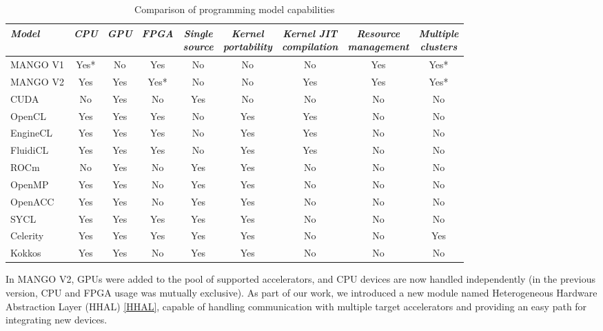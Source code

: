 \begin{table}[ht]
    \centering
    \begin{tabular}{l|c|c|c|c|c|c|c|c}
    \textit{Model} & \textit{CPU} & \textit{GPU} & \textit{FPGA} & \makecell{\textit{Single} \\ \textit{source}} & \makecell{\textit{Kernel} \\ \textit{portability}} & \makecell{\textit{Kernel JIT} \\ \textit{compilation}} & \makecell{\textit{Resource} \\ \textit{management}} & \makecell{\textit{Multiple} \\ \textit{clusters}} \\ \hline
    MANGO V1 & Yes* & No & Yes & No & No & No & Yes & Yes* \\
    MANGO V2 & Yes & Yes & Yes* & No & No & Yes & Yes & Yes* \\
    CUDA & No & Yes & No & Yes & No & No & No & No \\
    OpenCL & Yes & Yes & Yes & No & Yes & Yes & No & No \\
    EngineCL & Yes & Yes & Yes & No & Yes & Yes & No & No \\
    FluidiCL & Yes & Yes & Yes & No & Yes & Yes & No & No \\
    ROCm & No & Yes & No & Yes & Yes & No & No & No \\
    OpenMP & Yes & Yes & No & Yes & Yes & No & No & No  \\
    OpenACC & Yes & Yes & No & Yes & Yes & No & No & No  \\
    SYCL & Yes & Yes & Yes & Yes & Yes & No & No & No \\
    Celerity & Yes & Yes & Yes & Yes & Yes & No & No & Yes \\
    Kokkos & Yes & Yes & No & Yes & Yes & No & No & No 
    \end{tabular}
    \captionsetup{justification=centering}
    \caption{Comparison of programming model capabilities}
    \label{tab:progamming-model-comparison}
\end{table}

In MANGO V2, GPUs were added to the pool of supported accelerators, and CPU devices are now handled independently (in the previous version, CPU and FPGA usage was mutually exclusive).
As part of our work, we introduced a new module named Heterogeneous Hardware Abstraction Layer (HHAL) \ref{HHAL}, capable of handling communication with multiple target accelerators and providing an easy path for integrating new devices.


